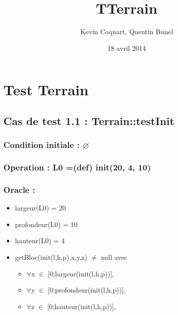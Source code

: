 \documentclass[11pt]{article}
\title{TTerrain}
\author{Kevin Coquart, Quentin Bunel}
\date{18 avril 2014}
\begin{document}
\maketitle

\setcounter{tocdepth}{3}
\tableofcontents
\vspace*{1cm}
\section{Test Terrain}
\label{sec-1}


\subsection{Cas de test 1.1 : Terrain::testInit}
\label{sec-1.1}

\subsubsection{Condition initiale : $\varnothing$}
\label{sec-1.1.1}

\subsubsection{Operation : L0 =(def) init(20, 4, 10)}
\label{sec-1.1.2}

\subsubsection{Oracle :}
\label{sec-1.1.3}

\begin{itemize}

\item largeur(L0) = 20\\
\label{sec-1.1.3.1}


\item profondeur(L0) = 10\\
\label{sec-1.1.3.2}


\item hauteur(L0) = 4\\
\label{sec-1.1.3.3}


\item getBloc(init(l,h,p),x,y,z) $\neq$ null avec\\
\label{sec-1.1.3.4}

\begin{itemize}

\item $\forall$x $\in$ [0;largeur(init(l,h,p))],\\
\label{sec-1.1.3.4.1}


\item $\forall$y $\in$ [0;profondeur(init(l,h,p))],\\
\label{sec-1.1.3.4.2}


\item $\forall$z $\in$ [0;hauteur(init(l,h,p))],\\
\label{sec-1.1.3.4.3}


\end{itemize} %
\end{itemize} %
\end{document}
